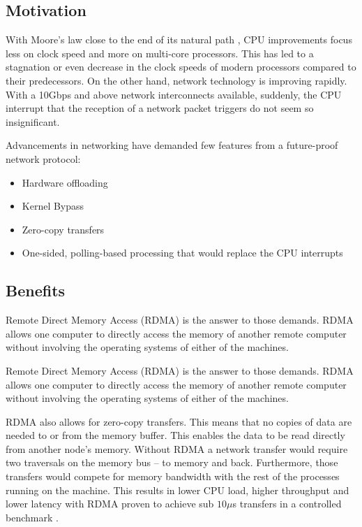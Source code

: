 \documentclass[bsc,frontabs,twoside,singlespacing,parskip,deptreport,hidel]{infthesis}     %
\begin{document}
\subsection{Motivation}
With Moore's law close to the end of its natural path \cite{MooresLaw_mit_techreview:online,MooresLaw_techworld:online}, CPU improvements focus less on clock speed and more on multi-core processors. This has led to a stagnation or even decrease in the clock speeds of modern processors compared to their predecessors. On the other hand, network technology is improving rapidly. With a 10Gbps and above network interconnects available, suddenly, the CPU interrupt that the reception of a network packet triggers do not seem so insignificant.

Advancements in networking have demanded few features from a future-proof network protocol: 
\begin{itemize}
  \item Hardware offloading
  \item Kernel Bypass
  \item Zero-copy transfers
  \item One-sided, polling-based processing that would replace the CPU interrupts
\end{itemize}

\subsection{Benefits}

Remote Direct Memory Access (RDMA) is the answer to those demands. RDMA allows one computer to directly access the memory of another remote computer without involving the operating systems of either of the machines.

Remote Direct Memory Access (RDMA) is the answer to those demands. RDMA allows one computer to directly access the memory of another remote computer without involving the operating systems of either of the machines. 

RDMA also allows for zero-copy transfers. This means that no copies of data are needed to or from the memory buffer. This enables the data to be read directly from another node's memory.  Without RDMA a network transfer would require two traversals on the memory bus – to memory and back. Furthermore, those transfers would compete for memory bandwidth with the rest of the processes running on the machine. This results in lower CPU load, higher throughput and lower latency with RDMA proven to achieve sub $10 \mu$s transfers in a controlled benchmark \cite{kal2016design_guidelines}.
\end{document}
